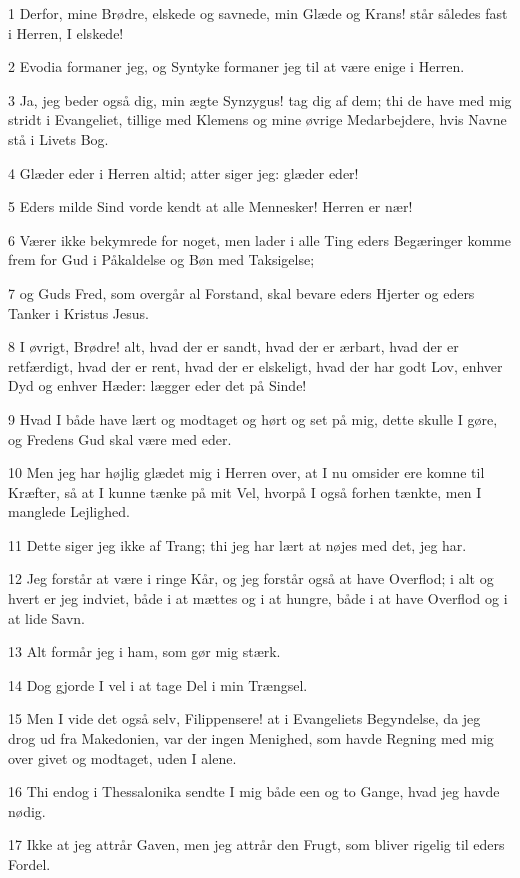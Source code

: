\par 1 Derfor, mine Brødre, elskede og savnede, min Glæde og Krans! står således fast i Herren, I elskede!
\par 2 Evodia formaner jeg, og Syntyke formaner jeg til at være enige i Herren.
\par 3 Ja, jeg beder også dig, min ægte Synzygus! tag dig af dem; thi de have med mig stridt i Evangeliet, tillige med Klemens og mine øvrige Medarbejdere, hvis Navne stå i Livets Bog.
\par 4 Glæder eder i Herren altid; atter siger jeg: glæder eder!
\par 5 Eders milde Sind vorde kendt at alle Mennesker! Herren er nær!
\par 6 Værer ikke bekymrede for noget, men lader i alle Ting eders Begæringer komme frem for Gud i Påkaldelse og Bøn med Taksigelse;
\par 7 og Guds Fred, som overgår al Forstand, skal bevare eders Hjerter og eders Tanker i Kristus Jesus.
\par 8 I øvrigt, Brødre! alt, hvad der er sandt, hvad der er ærbart, hvad der er retfærdigt, hvad der er rent, hvad der er elskeligt, hvad der har godt Lov, enhver Dyd og enhver Hæder: lægger eder det på Sinde!
\par 9 Hvad I både have lært og modtaget og hørt og set på mig, dette skulle I gøre, og Fredens Gud skal være med eder.
\par 10 Men jeg har højlig glædet mig i Herren over, at I nu omsider ere komne til Kræfter, så at I kunne tænke på mit Vel, hvorpå I også forhen tænkte, men I manglede Lejlighed.
\par 11 Dette siger jeg ikke af Trang; thi jeg har lært at nøjes med det, jeg har.
\par 12 Jeg forstår at være i ringe Kår, og jeg forstår også at have Overflod; i alt og hvert er jeg indviet, både i at mættes og i at hungre, både i at have Overflod og i at lide Savn.
\par 13 Alt formår jeg i ham, som gør mig stærk.
\par 14 Dog gjorde I vel i at tage Del i min Trængsel.
\par 15 Men I vide det også selv, Filippensere! at i Evangeliets Begyndelse, da jeg drog ud fra Makedonien, var der ingen Menighed, som havde Regning med mig over givet og modtaget, uden I alene.
\par 16 Thi endog i Thessalonika sendte I mig både een og to Gange, hvad jeg havde nødig.
\par 17 Ikke at jeg attrår Gaven, men jeg attrår den Frugt, som bliver rigelig til eders Fordel.
